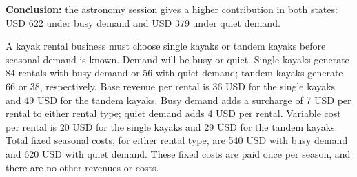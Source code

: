 \textbf{Conclusion:} the astronomy session gives a higher contribution in both states: USD 622 under busy demand and USD 379 under quiet demand.
\par\vspace{4mm}

\clearpage
{}
\begingroup\setlength{\parskip}{2pt}\linespread{1.02}\selectfont
A kayak rental business must choose single kayaks or tandem kayaks before seasonal demand is known. Demand will be busy or quiet. Single kayaks generate 84 rentals with busy demand or 56 with quiet demand; tandem kayaks generate 66 or 38, respectively. Base revenue per rental is 36 USD for the single kayaks and 49 USD for the tandem kayaks. Busy demand adds a surcharge of 7 USD per rental to either rental type; quiet demand adds 4 USD per rental. Variable cost per rental is 20 USD for the single kayaks and 29 USD for the tandem kayaks. Total fixed seasonal costs, for either rental type, are 540 USD with busy demand and 620 USD with quiet demand. These fixed costs are paid once per season, and there are no other revenues or costs.
